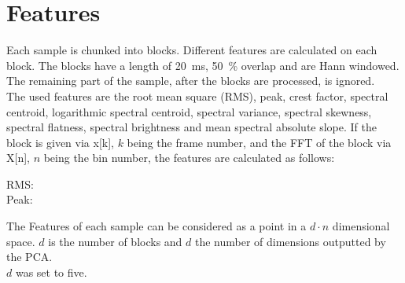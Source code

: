 \section{Features}
\label{sec:Features}
Each sample is chunked into blocks. Different features are calculated on each block. The blocks have a length of 20~ms, 50~\% overlap and are Hann windowed. The remaining part of the sample, after the blocks are processed, is ignored.\\
The used features are the root mean square (RMS), peak, crest factor, spectral centroid, logarithmic spectral centroid, spectral variance, spectral skewness, spectral flatness, spectral brightness and mean spectral absolute slope. If the block is given via x[k], $k$ being the frame number, and the FFT of the block via X[n], $n$ being the bin number, the features are calculated as follows:
\begin{description}
    \item[RMS:]

    \item[Peak:]

\end{description}


The Features of each sample can be considered as a point in a $d \cdot n$ dimensional space. $d$ is the number of blocks and $d$ the number of dimensions outputted by the PCA.\\
$d$ was set to five.